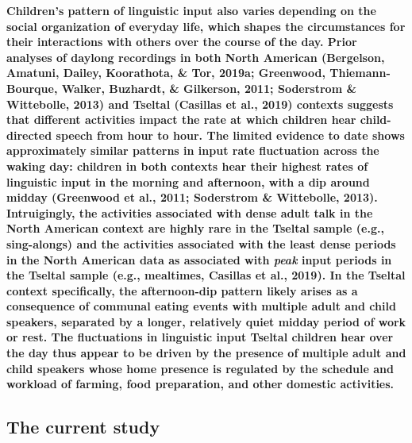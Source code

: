 \documentclass[,man,floatsintext]{apa6}
\begin{document}
\textbf{Children's pattern of linguistic input also varies depending on
the social organization of everyday life, which shapes the circumstances
for their interactions with others over the course of the day. Prior
analyses of daylong recordings in both North American (Bergelson,
Amatuni, Dailey, Koorathota, \& Tor, 2019a; Greenwood, Thiemann-Bourque,
Walker, Buzhardt, \& Gilkerson, 2011; Soderstrom \& Wittebolle, 2013)
and Tseltal (Casillas et al., 2019) contexts suggests that different
activities impact the rate at which children hear child-directed speech
from hour to hour. The limited evidence to date shows approximately
similar patterns in input rate fluctuation across the waking day:
children in both contexts hear their highest rates of linguistic input
in the morning and afternoon, with a dip around midday (Greenwood et
al., 2011; Soderstrom \& Wittebolle, 2013). Intruigingly, the activities
associated with dense adult talk in the North American context are
highly rare in the Tseltal sample (e.g., sing-alongs) and the activities
associated with the least dense periods in the North American data as
associated with \emph{peak} input periods in the Tseltal sample (e.g.,
mealtimes, Casillas et al., 2019). In the Tseltal context specifically,
the afternoon-dip pattern likely arises as a consequence of communal
eating events with multiple adult and child speakers, separated by a
longer, relatively quiet midday period of work or rest. The fluctuations
in linguistic input Tseltal children hear over the day thus appear to be
driven by the presence of multiple adult and child speakers whose home
presence is regulated by the schedule and workload of farming, food
preparation, and other domestic activities.}

\subsection{The current study}\label{the-current-study}
\end{document}
